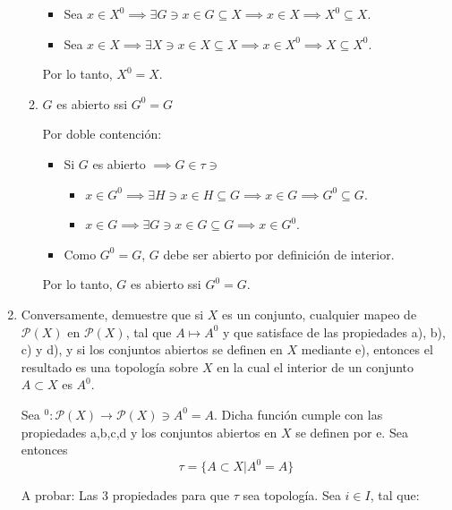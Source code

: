 \begin{problema}
\begin{enumerate}
\begin{enumerate}
\begin{dem}
\begin{itemize}
                    \item Sea $x\in X^0\implies \exists G\ni x\in G\subseteq X\implies x\in X\implies X^0\subseteq X$.
                    \item Sea $x\in X\implies \exists X\ni x\in X\subseteq X\implies x\in X^0\implies X\subseteq X^0$.
                \end{itemize}
                Por lo tanto, $X^0=X$.
            \end{dem}
            \item $G$ es abierto ssi $G^0=G$
            \begin{dem}
                Por doble contención: 
                \begin{itemize}
                    \item Si $G$ es abierto $\implies G\in \tau \ni$
                    \begin{itemize}
                        \item $x\in G^0\implies \exists H\ni x\in H\subseteq G\implies x\in G\implies G^0\subseteq G$.
                        \item $x\in G\implies\exists G\ni x\in G\subseteq G\implies x\in G^0$. 
                    \end{itemize}
                    \item Como $G^0=G$, $G$ debe ser abierto por definición de interior. 
                \end{itemize}
                Por lo tanto, $G$ es abierto ssi $G^0=G$.
            \end{dem}
        \end{enumerate}

        \item Conversamente, demuestre que si $X$ es un conjunto, cualquier mapeo de $\mathcal{P}(X)$ en $\mathcal{P}(X)$, tal que $A \mapsto A^0$ y que satisface de las propiedades a), b), c) y d), y si los conjuntos abiertos se definen en $X$ mediante e), entonces el resultado es una topología sobre $X$ en la cual el interior de un conjunto $A \subset X$ es $A^0$.
        \begin{dem}
            Sea $^0:\mathcal{P}(X)\to \mathcal{P}(X)\ni A^0=A$. Dicha función cumple con las propiedades a,b,c,d y los conjuntos abiertos en $X$ se definen por e. Sea entonces 
            $$\tau=\{A\subset X| A^0=A\}$$

            A probar: Las 3 propiedades para que $\tau$ sea topología. Sea $i\in I$, tal que:


\end{dem}
\end{enumerate}
\end{problema}
